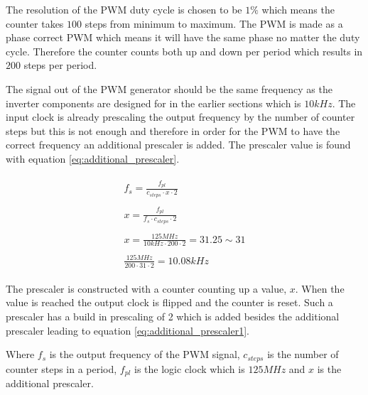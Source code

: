 The resolution of the PWM duty cycle is chosen to be $1\%$ which means the counter takes $100$ steps from minimum to maximum. The PWM is made as a phase correct PWM which means it will have the same phase no matter the duty cycle. Therefore the counter counts both up and down per period which results in $200$ steps per period. 

The signal out of the PWM generator should be the same frequency as the inverter components are designed for in the earlier sections which is $10kHz$. The input clock is already prescaling the output frequency by the number of counter steps but this is not enough and therefore in order for the PWM to have the correct frequency an additional prescaler is added. The prescaler value is found with equation \ref{eq:additional_prescaler}.



\begin{subequations}
    \begin{align}
        \begin{split}
            f_{s} = \frac{f_{pl}}{c_{steps} \cdot x \cdot 2}
            \label{eq:additional_prescaler1}
        \end{split} \\ 
        \begin{split}
             x = \frac{f_{pl}}{f_{s} \cdot c_{steps} \cdot 2}
        \end{split} \\ 
        \begin{split}
            x = \frac{125MHz}{10kHz \cdot 200 \cdot 2} = 31.25 \sim 31
            \label{eq:additional_prescaler}
        \end{split} \\
        \begin{split}
            \frac{125MHz}{200 \cdot 31 \cdot 2} = 10.08kHz
        \end{split}
    \end{align}
\end{subequations}

The prescaler is constructed with a counter counting up a value, $x$. When the value is reached the output clock is flipped and the counter is reset. Such a prescaler has a build in prescaling of 2 which is added besides the additional prescaler leading to equation \ref{eq:additional_prescaler1}. 

Where $f_{s}$ is the output frequency of the PWM signal, $c_{steps}$ is the number of counter steps in a period, $f_{pl}$ is the logic clock which is $125MHz$ and $x$ is the additional prescaler.

